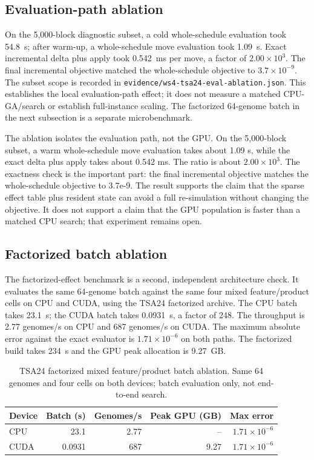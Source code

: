 \documentclass[11pt]{article}
\begin{document}
\subsection{Evaluation-path ablation}

On the 5,000-block diagnostic subset, a cold whole-schedule evaluation took
54.8~s; after warm-up, a whole-schedule move evaluation took 1.09~s. Exact
incremental delta plus apply took 0.542~ms per move, a factor of $2.00\times10^3$. The final
incremental objective matched the whole-schedule objective to
$3.7\times10^{-9}$. The subset scope is recorded in
\texttt{evidence/ws4-tsa24-eval-ablation.json}. This establishes the local
evaluation-path effect; it does not measure a matched CPU-GA/search or establish full-instance
scaling. The factorized 64-genome batch in the next subsection is a separate microbenchmark.

The ablation isolates the evaluation path, not the GPU. On the 5,000-block subset, a warm
whole-schedule move evaluation takes about 1.09 s, while the exact delta plus apply takes about
0.542 ms. The ratio is about $2.00\times10^3$. The exactness check is the important part: the final incremental
objective matches the whole-schedule objective to 3.7e-9. The result supports the claim that the
sparse effect table plus resident state can avoid a full re-simulation without changing the objective.
It does not support a claim that the GPU population is faster than a matched CPU search; that
experiment remains open.

\subsection{Factorized batch ablation}

The factorized-effect benchmark is a second, independent architecture check. It evaluates the same
64-genome batch against the same four mixed feature/product cells on CPU and CUDA, using the TSA24
factorized archive. The CPU batch takes 23.1~s; the CUDA batch takes 0.0931~s, a factor of 248.
The throughput is 2.77 genomes/s on CPU and 687 genomes/s on CUDA. The maximum absolute error
against the exact evaluator is $1.71\times10^{-6}$ on both paths. The factorized build takes 234~s
and the GPU peak allocation is 9.27~GB.

\begin{table}[t]
\centering
\caption{TSA24 factorized mixed feature/product batch ablation. Same 64 genomes and four cells on
both devices; batch evaluation only, not end-to-end search.}
\label{tab:factorized}
\small
\begin{tabular}{lrrrr}
\toprule
Device & Batch (s) & Genomes/s & Peak GPU (GB) & Max error \\
\midrule
CPU & 23.1 & 2.77 & -- & $1.71\times10^{-6}$ \\
CUDA & 0.0931 & 687 & 9.27 & $1.71\times10^{-6}$ \\
\bottomrule
\end{tabular}
\end{table}
\end{document}
